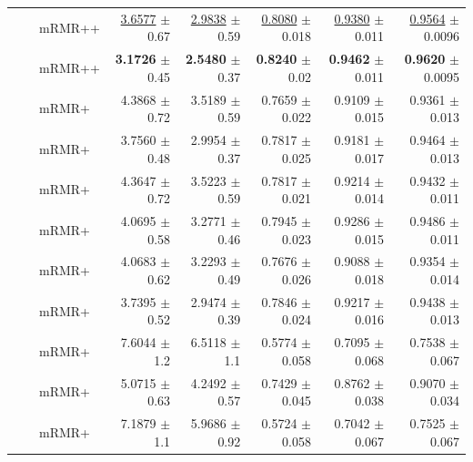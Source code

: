 \begin{longtable}{llp{}rrrrr}
 &  & mRMR++ & \underline{3.6577} {\scriptsize $\pm$ 0.67} & \underline{2.9838} {\scriptsize $\pm$ 0.59} & \underline{0.8080} {\scriptsize $\pm$ 0.018} & \underline{0.9380} {\scriptsize $\pm$ 0.011} & \underline{0.9564} {\scriptsize $\pm$ 0.0096} \\
 &  & mRMR++ & \textbf{3.1726} {\scriptsize $\pm$ 0.45} & \textbf{2.5480} {\scriptsize $\pm$ 0.37} & \textbf{0.8240} {\scriptsize $\pm$ 0.02} & \textbf{0.9462} {\scriptsize $\pm$ 0.011} & \textbf{0.9620} {\scriptsize $\pm$ 0.0095} \\
 &  & mRMR+ & 4.3868 {\scriptsize $\pm$ 0.72} & 3.5189 {\scriptsize $\pm$ 0.59} & 0.7659 {\scriptsize $\pm$ 0.022} & 0.9109 {\scriptsize $\pm$ 0.015} & 0.9361 {\scriptsize $\pm$ 0.013} \\
 &  & mRMR+ & 3.7560 {\scriptsize $\pm$ 0.48} & 2.9954 {\scriptsize $\pm$ 0.37} & 0.7817 {\scriptsize $\pm$ 0.025} & 0.9181 {\scriptsize $\pm$ 0.017} & 0.9464 {\scriptsize $\pm$ 0.013} \\
 &  & mRMR+ & 4.3647 {\scriptsize $\pm$ 0.72} & 3.5223 {\scriptsize $\pm$ 0.59} & 0.7817 {\scriptsize $\pm$ 0.021} & 0.9214 {\scriptsize $\pm$ 0.014} & 0.9432 {\scriptsize $\pm$ 0.011} \\
 &  & mRMR+ & 4.0695 {\scriptsize $\pm$ 0.58} & 3.2771 {\scriptsize $\pm$ 0.46} & 0.7945 {\scriptsize $\pm$ 0.023} & 0.9286 {\scriptsize $\pm$ 0.015} & 0.9486 {\scriptsize $\pm$ 0.011} \\
 &  & mRMR+ & 4.0683 {\scriptsize $\pm$ 0.62} & 3.2293 {\scriptsize $\pm$ 0.49} & 0.7676 {\scriptsize $\pm$ 0.026} & 0.9088 {\scriptsize $\pm$ 0.018} & 0.9354 {\scriptsize $\pm$ 0.014} \\
 &  & mRMR+ & 3.7395 {\scriptsize $\pm$ 0.52} & 2.9474 {\scriptsize $\pm$ 0.39} & 0.7846 {\scriptsize $\pm$ 0.024} & 0.9217 {\scriptsize $\pm$ 0.016} & 0.9438 {\scriptsize $\pm$ 0.013} \\
 &  & mRMR+ & 7.6044 {\scriptsize $\pm$ 1.2} & 6.5118 {\scriptsize $\pm$ 1.1} & 0.5774 {\scriptsize $\pm$ 0.058} & 0.7095 {\scriptsize $\pm$ 0.068} & 0.7538 {\scriptsize $\pm$ 0.067} \\
 &  & mRMR+ & 5.0715 {\scriptsize $\pm$ 0.63} & 4.2492 {\scriptsize $\pm$ 0.57} & 0.7429 {\scriptsize $\pm$ 0.045} & 0.8762 {\scriptsize $\pm$ 0.038} & 0.9070 {\scriptsize $\pm$ 0.034} \\
 &  & mRMR+ & 7.1879 {\scriptsize $\pm$ 1.1} & 5.9686 {\scriptsize $\pm$ 0.92} & 0.5724 {\scriptsize $\pm$ 0.058} & 0.7042 {\scriptsize $\pm$ 0.067} & 0.7525 {\scriptsize $\pm$ 0.067} \\

\end{longtable}
